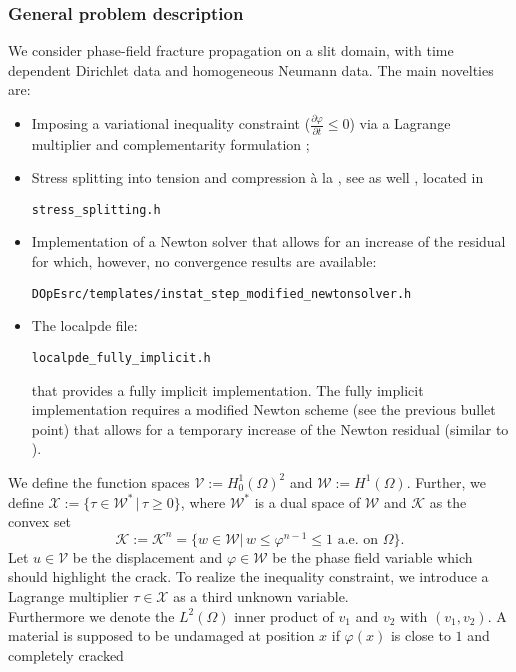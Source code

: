 \subsubsection{General problem description}
We consider phase-field fracture propagation on a slit domain, with time dependent 
Dirichlet data and homogeneous Neumann data.
The main novelties are:
\begin{itemize}
\item Imposing a variational inequality constraint ($\frac{\partial \varphi}{\partial t} \leq 0$)
via a Lagrange multiplier and complementarity formulation ;
\item Stress splitting into tension and compression \`a
la \cite{MieWelHof10a}, see as well \cite{AmorMarigoMaurini2009}, located 
in 
\begin{verbatim}
stress_splitting.h
\end{verbatim}
\item Implementation of a Newton solver that 
allows for an increase of the residual for which, however,
no convergence results are available:
\begin{verbatim}
DOpEsrc/templates/instat_step_modified_newtonsolver.h
\end{verbatim}
\item The localpde file:
\begin{verbatim}
localpde_fully_implicit.h
\end{verbatim}
that provides a fully implicit implementation.
The fully implicit implementation requires a modified Newton scheme (see the
previous bullet point) that 
allows for a temporary increase of the Newton residual (similar to \cite{Wi17_pff_error_oriented_Newton}).
\end{itemize}
We define the function spaces $\mathcal{V}:= H_0^1(\Omega)^2$ and
$\mathcal{W}:=  H^1(\Omega)$. 
Further, we define $\mathcal{X}:=\{\tau \in \mathcal{W}^*\, \vert\, \tau \geq 0\}$, 
where $\mathcal{W}^*$ is a dual space of $\mathcal{W}$ and $\mathcal{K}$ as the convex set
\[
\mathcal{K}:= \mathcal{K}^n = \{w\in \mathcal{W} |\, w\leq \varphi^{n-1} \leq 1 \text{ a.e. on }
\Omega\}.
\] 
Let $u \in \mathcal{V}$ be the displacement and $\varphi \in \mathcal{W}$ be the phase field variable which should highlight the crack.
To realize the inequality constraint, we introduce a Lagrange multiplier $\tau \in \mathcal{X}$ as a third unknown variable. \\
Furthermore we denote the $L^2(\Omega)$ inner product of $v_1$ and $v_2$ with $(v_1,v_2)$.
A material is supposed to be undamaged at position $x$ if $\varphi(x)$ is close to $1$ and completely cracked

